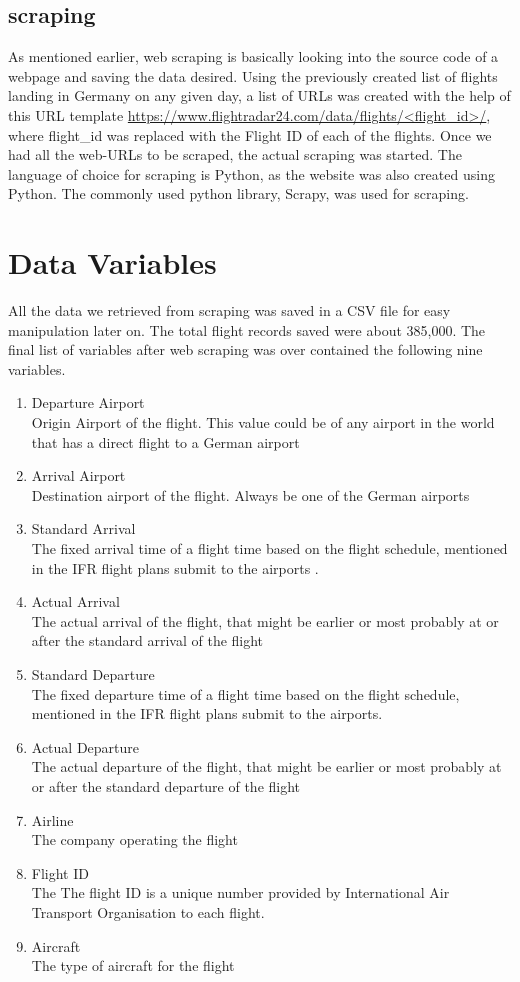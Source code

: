\subsection{scraping}
As mentioned earlier, web scraping is basically looking into the source code of a webpage and saving the data desired. Using the previously created list of flights landing in Germany on any given day, a list of URLs was created with the help of this URL template \url{https://www.flightradar24.com/data/flights/<flight_id>/}, where flight\_id was replaced with the Flight ID of each of the flights. 
Once we had all the web-URLs to be scraped, the actual scraping was started. The language of choice for scraping is Python, as the website was also created using Python. The commonly used python library, Scrapy, was used for scraping. 
 

\section{Data Variables}
All the data we retrieved from scraping was saved in a CSV file for easy manipulation later on. The total flight records saved were about 385,000. 
The final list of variables after web scraping was over contained the following nine variables.
\begin{enumerate}
    \item {Departure Airport}
    \\Origin Airport of the flight. This value could be of any airport in the world that has a direct flight to a German airport
    \item {Arrival Airport}
    \\Destination airport of the flight. Always be one of the German airports
    \item {Standard Arrival}
    \\The fixed arrival time of a flight time based on the flight schedule, mentioned in the IFR flight plans submit to the airports .
    \item {Actual Arrival}
    \\The actual arrival of the flight, that might be earlier or most probably at or after the standard arrival of the flight
    \item {Standard Departure}
    \\The fixed departure time of a flight time based on the flight schedule, mentioned in the IFR flight plans submit to the airports.
    \item {Actual Departure}
    \\The actual departure of the flight, that might be earlier or most probably at or after the standard departure of the flight
    \item {Airline}
    \\The company operating the flight
    \item {Flight ID}
    \\The The flight ID is a unique number provided by International Air Transport Organisation to each flight.
    \item {Aircraft}
    \\The type of aircraft for the flight
\end{enumerate}

